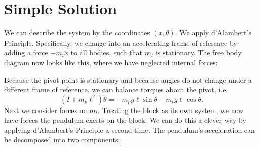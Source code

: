\documentclass{article}
\begin{document}
\section*{Simple Solution}
\vspace{-2mm}
We can describe the system by the coordinates $(x,\theta).$ We apply d'Alambert's Principle. Specifically, we change into an accelerating frame of reference by adding a force $-m_t\ddot{x}$ to all bodies, such that $m_t$ is stationary. The free body diagram now looks like this, where we have neglected internal forces:
\begin{center}
\end{center}
Because the pivot point is stationary and because angles do not change under a different frame of reference, we can balance torques about the pivot, i.e. 
\begin{equation}
    \boxed{(I + m_p \ell^2)\ddot{\theta} = -m_pg \ell \sin\theta - m_tg\ell\cos\theta}.
\end{equation}
Next we consider forces on $m_t.$ Treating the block as its own system, we now have forces the pendulum exerts on the block. We can do this a clever way by applying d'Alambert's Principle a second time. The pendulum's acceleration can be decomposed into two components:
\end{document}
